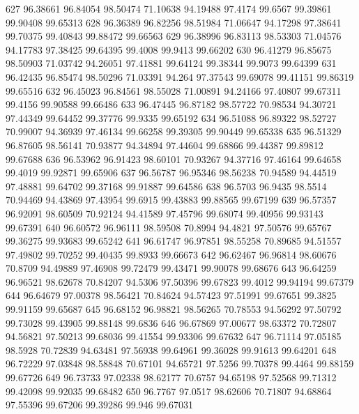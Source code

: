 627	96.38661	96.84054	98.50474	71.10638	94.19488	97.4174	99.6567	99.39861	99.90408	99.65313
628	96.36389	96.82256	98.51984	71.06647	94.17298	97.38641	99.70375	99.40843	99.88472	99.66563
629	96.38996	96.83113	98.53303	71.04576	94.17783	97.38425	99.64395	99.4008	99.9413	99.66202
630	96.41279	96.85675	98.50903	71.03742	94.26051	97.41881	99.64124	99.38344	99.9073	99.64399
631	96.42435	96.85474	98.50296	71.03391	94.264	97.37543	99.69078	99.41151	99.86319	99.65516
632	96.45023	96.84561	98.55028	71.00891	94.24166	97.40807	99.67311	99.4156	99.90588	99.66486
633	96.47445	96.87182	98.57722	70.98534	94.30721	97.44349	99.64452	99.37776	99.9335	99.65192
634	96.51088	96.89322	98.52727	70.99007	94.36939	97.46134	99.66258	99.39305	99.90449	99.65338
635	96.51329	96.87605	98.56141	70.93877	94.34894	97.44604	99.68866	99.44387	99.89812	99.67688
636	96.53962	96.91423	98.60101	70.93267	94.37716	97.46164	99.64658	99.4019	99.92871	99.65906
637	96.56787	96.95346	98.56238	70.94589	94.44519	97.48881	99.64702	99.37168	99.91887	99.64586
638	96.5703	96.9435	98.5514	70.94469	94.43869	97.43954	99.6915	99.43883	99.88565	99.67199
639	96.57357	96.92091	98.60509	70.92124	94.41589	97.45796	99.68074	99.40956	99.93143	99.67391
640	96.60572	96.96111	98.59508	70.8994	94.4821	97.50576	99.65767	99.36275	99.93683	99.65242
641	96.61747	96.97851	98.55258	70.89685	94.51557	97.49802	99.70252	99.40435	99.8933	99.66673
642	96.62467	96.96814	98.60676	70.8709	94.49889	97.46908	99.72479	99.43471	99.90078	99.68676
643	96.64259	96.96521	98.62678	70.84207	94.5306	97.50396	99.67823	99.4012	99.94194	99.67379
644	96.64679	97.00378	98.56421	70.84624	94.57423	97.51991	99.67651	99.3825	99.91159	99.65687
645	96.68152	96.98821	98.56265	70.78553	94.56292	97.50792	99.73028	99.43905	99.88148	99.6836
646	96.67869	97.00677	98.63372	70.72807	94.56821	97.50213	99.68036	99.41554	99.93306	99.67632
647	96.71114	97.05185	98.5928	70.72839	94.63481	97.56938	99.64961	99.36028	99.91613	99.64201
648	96.72229	97.03848	98.58848	70.67101	94.65721	97.5256	99.70378	99.4464	99.88159	99.67726
649	96.73733	97.02338	98.62177	70.6757	94.65198	97.52568	99.71312	99.42098	99.92035	99.68482
650	96.7767	97.0517	98.62606	70.71807	94.68864	97.55396	99.67206	99.39286	99.946	99.67031
